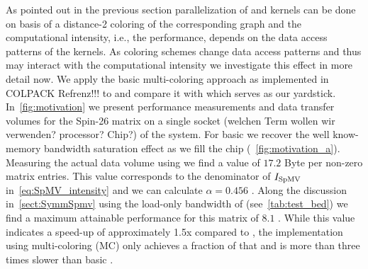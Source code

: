 
As pointed out in the previous section parallelization of \SymmSpmv and \KACZ kernels can be done on basis of a distance-2 coloring of the corresponding graph and the computational intensity, i.e., the performance, depends on the data access patterns of the kernels. As coloring schemes change data access patterns and thus may interact with the computational intensity we investigate this effect in more detail now. We apply  the basic multi-coloring approach as implemented in COLPACK {\GW Refrenz!!!} to \SymmSpmv and compare it with \SpMV which serves as our yardstick. In~\cref{fig:motivation} we present performance measurements and data transfer volumes for the Spin-26 matrix on a single socket ({\GW welchen Term wollen wir verwenden? processor? Chip?}) of the \IVB system. For basic \SpMV we recover the well know-memory bandwidth saturation effect as we fill the chip (~\cref{fig:motivation_a}). Measuring the actual data volume using \LIKWID we find a value of $17.2$ Byte per non-zero matrix entries. This value corresponds to the denominator of $I_\mathrm{SpMV}$ in~\cref{eq:SpMV_intensity} and we can calculate $\alpha=0.456$ . Along the discussion in~\cref{sect:SymmSpmv} using the load-only bandwidth of \IVB (see~\cref{tab:test_bed}) we find a maximum attainable performance for this matrix of $8.1$ \GF. While this value indicates a speed-up of approximately 1.5x compared to \SpMV, the \SymmSpmv implementation using multi-coloring (MC) only achieves a fraction of that and is more than three times slower than basic \SpMV. 



